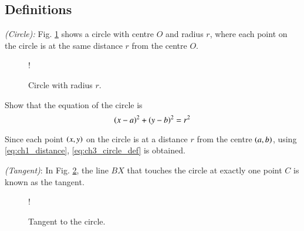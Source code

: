 \subsection{Definitions}

\begin{definition}
{\em (Circle):} Fig. \ref{fig:ch3_circle_def} shows a circle with centre $O$ and radius $r$, where each point on the circle is at the same distance $r$ from the centre $O$.
\end{definition}
\begin{figure}[!h]
\centering
\resizebox {\columnwidth} {!} {

}
\caption{Circle with radius $r$.}
\label{fig:ch3_circle_def}
\end{figure}
%
\begin{problem}
Show that the equation of the circle is 
%
\begin{equation}
\label{eq:ch3_circle_def}
\left(x-a\right)^2 + \left(y-b\right)^2 = r^2
\end{equation}
%
\end{problem}
\proof Since each point $\left(x,y\right)$ on the circle is at a distance $r$ from the centre $\left(a,b\right)$, using \eqref{eq:ch1_distance}, \eqref{eq:ch3_circle_def} is obtained.
%
\begin{definition}
{\em (Tangent)}: In Fig. \ref{fig:ch3_tangent_def},  the line $BX$ that touches the circle at exactly one point $C$ is known as the tangent.
\end{definition}
%
\begin{figure}[!h]
\centering
\resizebox {\columnwidth} {!} {

}
\caption{Tangent to the circle.}
\label{fig:ch3_tangent_def}
\end{figure}
%
